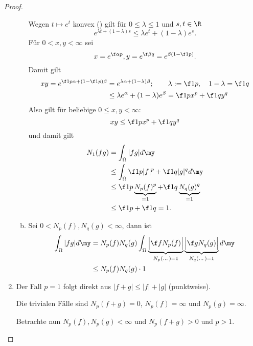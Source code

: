\begin{st}
\begin{proof}
\begin{enumerate}[1)]
\begin{enumerate}[a)]
						Wegen $t \mapsto e^t$ konvex (\fixme[Zeichnung]) gilt für $0 \le \lambda \le 1$ und $s,t \in \R$
						\[
							e^{\lambda t + (1-\lambda)s} \le \lambda e^t + (1-\lambda)e^s.
						\]
						Für $0 < x,y < \infty$ sei
						\[
							x = e^{\f \alpha p}, y = e^{\f \beta q} = e^{\beta (1 - \f 1p)}.
						\]
						Damit gilt
						\begin{align*}
							xy = e^{\f 1p \alpha + (1-\f 1p)\beta} 
							&= e^{\lambda \alpha + (1-\lambda) \beta}; \qquad \lambda := \f 1p, \quad 1-\lambda = \f 1q \\
							&\le \lambda e^{\alpha}  + (1-\lambda) e^{\beta} 
							= \f 1p x^p + \f 1q y^q
						\end{align*}
						Also gilt für beliebige $0 \le x,y < \infty$:
						\[
							xy \le \f 1p x^p + \f 1q y^q
						\]
						und damit gilt
						\begin{align*}
							N_1(fg) 
							&= \int_{\Omega} |fg| d\my \\
							&\le \int_{\Omega} \f 1p |f|^p + \f 1q |g|^q d\my \\
							&\le \f 1p \underbrace{N_p(f)^p}_{=1} + \f 1q \underbrace{N_q(g)^q}_{=1} \\
							&\le \f 1p + \f 1q = 1.
						\end{align*}
					\item
						Sei $0 < N_p(f), N_q(g) < \infty$, dann ist
						\begin{align*}
							\int_{\Omega}|fg| d\my
							&= N_p(f)N_q(g) \int_{\Omega} \underbrace{\Big| \f f{N_p(f)} \Big|}_{N_p(\dots)=1} \underbrace{\Big| \f g{N_q(g)} \Big|}_{N_q(\dots)=1} d\my \\
							&\le N_p(f) N_q(g) \cdot 1
						\end{align*}
				\end{enumerate}
			\item
				Der Fall $p=1$ folgt direkt aus $|f+g| \le |f| + |g|$ (punktweise).

				Die trivialen Fälle sind $N_p(f+g) = 0$, $N_p(f) = \infty$ und $N_p(g) = \infty$.

				Betrachte nun $N_p(f), N_p(g) < \infty$ und $N_p(f+g) > 0$ und $p>1$.
				

\end{enumerate}
\end{proof}
\end{st}
